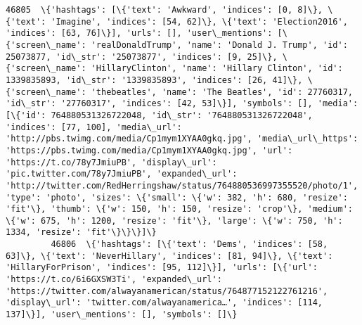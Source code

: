 \documentclass[11pt]{article}
\begin{document}
\begin{Verbatim}[commandchars=\\\{\}]
         46805  \{'hashtags': [\{'text': 'Awkward', 'indices': [0, 8]\}, \{'text': 'Imagine', 'indices': [54, 62]\}, \{'text': 'Election2016', 'indices': [63, 76]\}], 'urls': [], 'user\_mentions': [\{'screen\_name': 'realDonaldTrump', 'name': 'Donald J. Trump', 'id': 25073877, 'id\_str': '25073877', 'indices': [9, 25]\}, \{'screen\_name': 'HillaryClinton', 'name': 'Hillary Clinton', 'id': 1339835893, 'id\_str': '1339835893', 'indices': [26, 41]\}, \{'screen\_name': 'thebeatles', 'name': 'The Beatles', 'id': 27760317, 'id\_str': '27760317', 'indices': [42, 53]\}], 'symbols': [], 'media': [\{'id': 764880531326722048, 'id\_str': '764880531326722048', 'indices': [77, 100], 'media\_url': 'http://pbs.twimg.com/media/Cp1mym1XYAA0gkq.jpg', 'media\_url\_https': 'https://pbs.twimg.com/media/Cp1mym1XYAA0gkq.jpg', 'url': 'https://t.co/78y7JmiuPB', 'display\_url': 'pic.twitter.com/78y7JmiuPB', 'expanded\_url': 'http://twitter.com/RedHerringshaw/status/764880536997355520/photo/1', 'type': 'photo', 'sizes': \{'small': \{'w': 382, 'h': 680, 'resize': 'fit'\}, 'thumb': \{'w': 150, 'h': 150, 'resize': 'crop'\}, 'medium': \{'w': 675, 'h': 1200, 'resize': 'fit'\}, 'large': \{'w': 750, 'h': 1334, 'resize': 'fit'\}\}\}]\}   
         46806  \{'hashtags': [\{'text': 'Dems', 'indices': [58, 63]\}, \{'text': 'NeverHillary', 'indices': [81, 94]\}, \{'text': 'HillaryForPrison', 'indices': [95, 112]\}], 'urls': [\{'url': 'https://t.co/6i6GXSW3Ti', 'expanded\_url': 'https://twitter.com/alwayanamerican/status/764877152122761216', 'display\_url': 'twitter.com/alwayanamerica…', 'indices': [114, 137]\}], 'user\_mentions': [], 'symbols': []\}                                                                                                                                                                                                                                                                                                                                                                                                                                                                                                                                                                                                                                                                                                                                                                                                               

\end{Verbatim}
\end{document}
